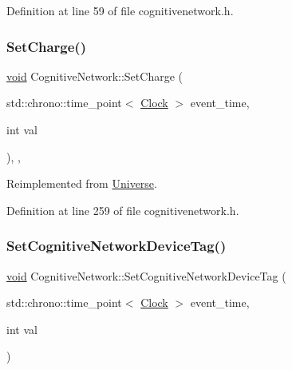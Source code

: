 Definition at line 59 of file cognitivenetwork.\+h.

\mbox{\label{class_cognitive_network_a99f801aeca299186cc706696696749b1}} 
\subsubsection{\texorpdfstring{Set\+Charge()}{SetCharge()}}
{\footnotesize\ttfamily \mbox{\hyperlink{glad_8h_a950fc91edb4504f62f1c577bf4727c29}{void}} Cognitive\+Network\+::\+Set\+Charge (\begin{DoxyParamCaption}\item[{std\+::chrono\+::time\+\_\+point$<$ \mbox{\hyperlink{universe_8h_a0ef8d951d1ca5ab3cfaf7ab4c7a6fd80}{Clock}} $>$}]{event\+\_\+time,  }\item[{int}]{val }\end{DoxyParamCaption})\hspace{0.3cm}{\ttfamily [inline]}, {\ttfamily [final]}, {\ttfamily [virtual]}}



Reimplemented from \mbox{\hyperlink{class_universe_a3b3da7c86a7b75e5e5c0b7972ac82a87}{Universe}}.



Definition at line 259 of file cognitivenetwork.\+h.

\mbox{\label{class_cognitive_network_a0e8a64151a2446fc16a074ad2de325df}} 
\subsubsection{\texorpdfstring{Set\+Cognitive\+Network\+Device\+Tag()}{SetCognitiveNetworkDeviceTag()}}
{\footnotesize\ttfamily \mbox{\hyperlink{glad_8h_a950fc91edb4504f62f1c577bf4727c29}{void}} Cognitive\+Network\+::\+Set\+Cognitive\+Network\+Device\+Tag (\begin{DoxyParamCaption}\item[{std\+::chrono\+::time\+\_\+point$<$ \mbox{\hyperlink{universe_8h_a0ef8d951d1ca5ab3cfaf7ab4c7a6fd80}{Clock}} $>$}]{event\+\_\+time,  }\item[{int}]{val }\end{DoxyParamCaption})\hspace{0.3cm}{\ttfamily [inline]}}



